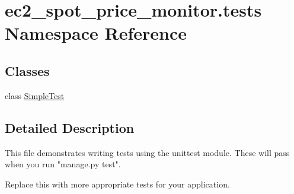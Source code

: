 \hypertarget{namespaceec2__spot__price__monitor_1_1tests}{\section{ec2\-\_\-spot\-\_\-price\-\_\-monitor.\-tests Namespace Reference}
\label{namespaceec2__spot__price__monitor_1_1tests}
}
\subsection*{Classes}
\begin{DoxyCompactItemize}
\item 
class \hyperlink{classec2__spot__price__monitor_1_1tests_1_1SimpleTest}{Simple\-Test}
\end{DoxyCompactItemize}


\subsection{Detailed Description}
\begin{DoxyVerb}This file demonstrates writing tests using the unittest module. These will pass
when you run "manage.py test".

Replace this with more appropriate tests for your application.
\end{DoxyVerb}
 